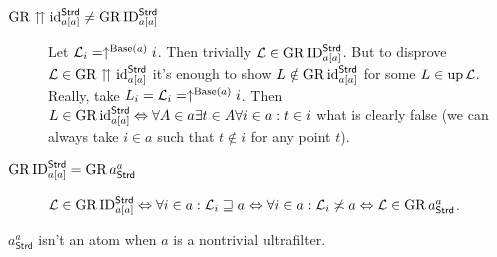 \begin{description}
\item [{$\operatorname{GR}\upuparrows\operatorname{id}_{a[a]}^{\mathsf{Strd}}\neq\operatorname{GR}\operatorname{ID}_{a[a]}^{\mathsf{Strd}}$}] Let
$\mathcal{L}_{i}=\uparrow^{\operatorname{Base}(a)}i$. Then trivially $\mathcal{L}\in\operatorname{GR}\operatorname{ID}_{a[a]}^{\mathsf{Strd}}$.
But to disprove $\mathcal{L}\in\operatorname{GR}\upuparrows\operatorname{id}_{a[a]}^{\mathsf{Strd}}$
it's enough to show $L\notin\operatorname{GR}\operatorname{id}_{a[a]}^{\mathsf{Strd}}$ for some
$L\in\operatorname{up}\mathcal{L}$. Really, take $L_{i}=\mathcal{L}_{i}=\uparrow^{\operatorname{Base}(a)}i$.
Then $L\in\operatorname{GR}\operatorname{id}_{a[a]}^{\mathsf{Strd}}\Leftrightarrow\forall A\in a\exists t\in A\forall i\in a:t\in i$
what is clearly false (we can always take $i\in a$ such that $t\notin i$
for any point $t$).
\item [{$\operatorname{GR}\operatorname{ID}_{a[a]}^{\mathsf{Strd}}=\operatorname{GR} a_{\mathsf{Strd}}^{a}$}] $\mathcal{L}\in\operatorname{GR}\operatorname{ID}_{a[a]}^{\mathsf{Strd}}\Leftrightarrow\forall i\in a:\mathcal{L}_{i}\sqsupseteq a\Leftrightarrow\forall i\in a:\mathcal{L}_{i}\not\asymp a\Leftrightarrow\mathcal{L}\in\operatorname{GR} a_{\mathsf{Strd}}^{a}$.\end{description}
\begin{cor}
$a_{\mathsf{Strd}}^{a}$ isn't an atom when $a$ is a nontrivial ultrafilter.
\end{cor}

